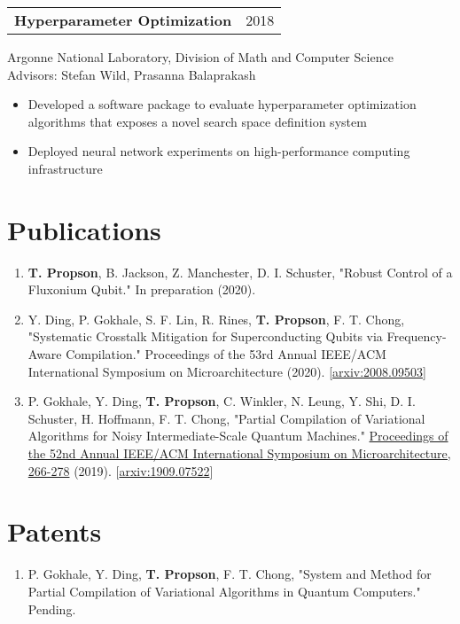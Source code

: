 \documentclass[letterpaper, 12pt]{article}
\begin{document}
\begin{tabular}{@{} L{12cm} @{} R{4.51cm} @{}}
  \textbf{Hyperparameter Optimization} & 2018\\
\end{tabular}
Argonne National Laboratory, Division of Math and Computer Science\\
Advisors: Stefan Wild, Prasanna Balaprakash
\begin{itemize}
\item Developed a software package to evaluate hyperparameter optimization algorithms
  that exposes a novel search space definition system
  \item Deployed neural network experiments on high-performance computing infrastructure 
\end{itemize}

\section{Publications}
\begin{enumerate}
\item \textbf{T. Propson}, B. Jackson, Z. Manchester, D. I. Schuster, "Robust Control
  of a Fluxonium Qubit." In preparation (2020).
\item Y. Ding, P. Gokhale, S. F. Lin, R. Rines, \textbf{T. Propson}, F. T. Chong,
  "Systematic Crosstalk Mitigation for Superconducting Qubits via Frequency-Aware Compilation."
  Proceedings of the 53rd Annual
  IEEE/ACM International Symposium on Microarchitecture (2020).
       [\href{https://arxiv.org/abs/2008.09503}{arxiv:2008.09503}]
\item P. Gokhale, Y. Ding, \textbf{T. Propson}, C. Winkler, N. Leung, Y. Shi,
  D. I. Schuster, H. Hoffmann, F. T. Chong,
  "Partial Compilation of Variational Algorithms for Noisy Intermediate-Scale Quantum Machines."
  \href{https://doi.org/10.1145/3352460.3358313}{Proceedings of the 52nd Annual
    IEEE/ACM International Symposium on Microarchitecture, 266-278} (2019).
       [\href{https://arxiv.org/abs/1909.07522}{arxiv:1909.07522}]
\end{enumerate}

\pagebreak

\section{Patents}
\begin{enumerate}
  \item P. Gokhale, Y. Ding, \textbf{T. Propson}, F. T. Chong, "System and Method
    for Partial Compilation of Variational Algorithms in Quantum Computers." Pending.
\end{enumerate}
\end{document}
